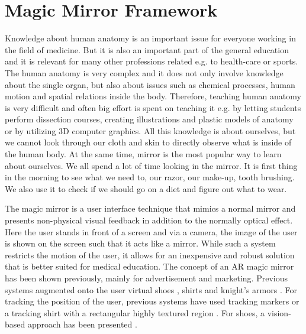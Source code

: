 
\section{Magic Mirror Framework} \label{sec:3-PPMM:MMC}
Knowledge about human anatomy is an important issue for everyone working in the field of medicine. But it is also an important part of the general education and it is relevant for many other professions related e.g. to health-care or sports. The human anatomy is very complex and it does not only involve knowledge about the single organ, but also about issues such as chemical processes, human motion and spatial relations inside the body. Therefore, teaching human anatomy is very difficult and often big effort is spent on teaching it e.g. by letting students perform dissection courses, creating illustrations and plastic models of anatomy or by utilizing 3D computer graphics. All this knowledge is about ourselves, but we cannot look through our cloth and skin to directly observe what is inside of the human body.  At the same time, mirror is the most popular way to learn about ourselves. We all spend a lot of time looking in the mirror. It is first thing in the morning to see what we need to, our razor, our make-up, tooth brushing. We also use it to check if we should go on a diet and figure out what to wear. 

The magic mirror\cite{Grosjean1999} is a user interface technique that mimics a normal mirror and presents non-physical visual feedback in addition to the normally optical effect. Here the user stands in front of a screen and via a camera, the image of the user is shown on the screen such that it acts like a mirror. While such a system restricts the motion of the user, it allows for an inexpensive and robust solution that is better suited for medical education. The concept of an AR magic mirror has been shown previously, mainly for advertisement and marketing. Previous systems augmented onto the user virtual shoes \cite{Eisert2008,Luh2013}, shirts \cite{Ehara2006} and knight's armors \cite{Fiala2007}. For tracking the position of the user, previous systems have used tracking markers \cite{Eisert2008,Fiala2007,Luh2013} or a tracking shirt with a rectangular highly textured region \cite{Hilsmann2008}. For shoes, a vision-based approach has been presented \cite{Eisert2008}.

